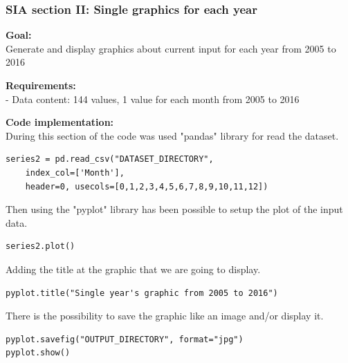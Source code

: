 \newpage
\subsubsection{SIA section II: Single graphics for each year}

\textbf{Goal:}\\
Generate and display graphics about current input for each year from 2005 to 2016

\textbf{Requirements:}\\
- Data content: 144 values, 1 value for each month from 2005 to 2016

\textbf{Code implementation:}\\
During this section of the code was used "pandas" library for read the dataset.
\begin{lstlisting}
series2 = pd.read_csv("DATASET_DIRECTORY", 
	index_col=['Month'], 
	header=0, usecols=[0,1,2,3,4,5,6,7,8,9,10,11,12])
\end{lstlisting}

Then using the "pyplot" library has been possible to setup the plot of the input data.
\begin{lstlisting}
series2.plot()
\end{lstlisting}

Adding the title at the graphic that we are going to display.
\begin{lstlisting}
pyplot.title("Single year's graphic from 2005 to 2016")
\end{lstlisting}

There is the possibility to save the graphic like an image and/or display it.
\begin{lstlisting}
pyplot.savefig("OUTPUT_DIRECTORY", format="jpg")
pyplot.show()
\end{lstlisting}


